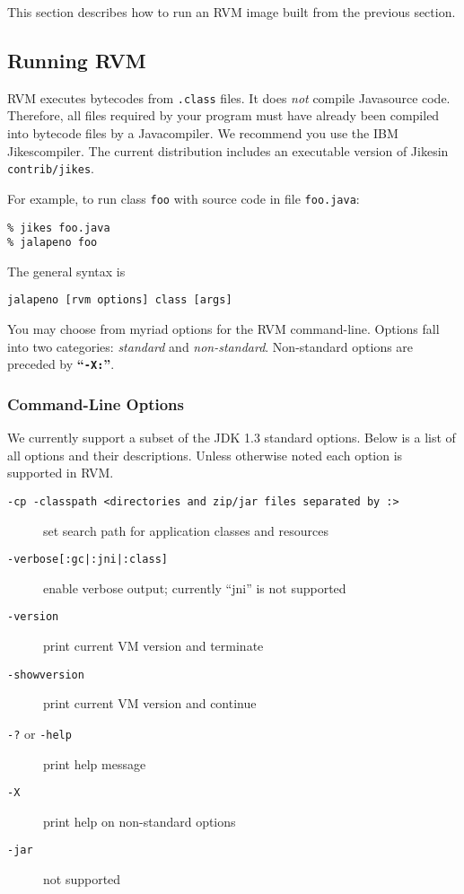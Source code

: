 This section describes how to run an RVM  image built from the previous
section. 

\subsection{Running RVM}

RVM executes bytecodes from {\tt .class} files. It does {\em not} compile
Java\trademark source code. Therefore, all files 
required by your program must have already been compiled into bytecode
files by a Java\trademark compiler.  We recommend you use the IBM Jikes\trademark compiler.
The current distribution includes an executable version of Jikes\trademark in
{\tt contrib/jikes}.

For example, to run class {\tt foo} with source code in file {\tt foo.java}:
\begin{verbatim}
% jikes foo.java
% jalapeno foo 
\end{verbatim}

The general syntax is
\begin{verbatim}
jalapeno [rvm options] class [args]
\end{verbatim}

You may choose from myriad options for the RVM command-line.  
Options fall into two categories: {\em standard} and {\em
non-standard}.  Non-standard options are preceded by {\bf ``{\tt -X:}''}.

\subsubsection{Command-Line Options}

We currently support a subset of the JDK 1.3 standard options.  Below
is a list of all options and their descriptions.  Unless otherwise noted each
option is supported in RVM.
\begin{description}
\item[{\tt -cp -classpath <directories and zip/jar files separated by :>}]
set search path for application classes and resources

\item[{\tt -verbose[:gc|:jni|:class]}]
enable verbose output; currently ``jni'' is not supported

\item[{\tt -version}] print current VM version and terminate

\item[{\tt -showversion}] print current VM version and continue

\item[{\tt -?} or {\tt -help}] print help message

\item[{\tt -X}] print help on non-standard options

\item[{\tt -jar}] not supported

\end{description}

